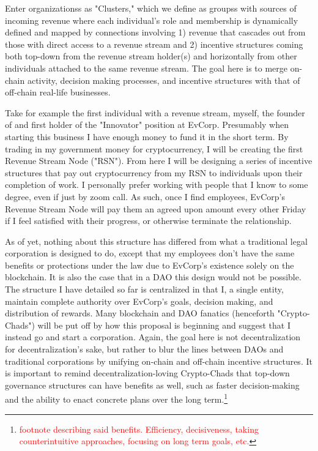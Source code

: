 \documentclass{article}[10pt]
\begin{document}
Enter organizationss as "Clusters," which we define as groupss with sources of incoming revenue where each individual's role and membership is dynamically defined and mapped by connections involving 1) revenue that cascades out from those with direct access to a revenue stream and 2) incentive structures coming both top-down from the revenue stream holder(s) and horizontally from other individuals attached to the same revenue stream. 
The goal here is to merge on-chain activity, decision making processes, and incentive structures with that of off-chain real-life businesses.\par

Take for example the first individual with a revenue stream, myself, the founder of and first holder of the "Innovator" position at EvCorp.
Presumably when starting this business I have enough money to fund it in the short term.
By trading in my government money for cryptocurrency, I will be creating the first Revenue Stream Node ("RSN"). 
From here I will be designing a series of incentive structures that pay out cryptocurrency from my RSN to individuals upon their completion of work.
I personally prefer working with people that I know to some degree, even if just by zoom call.
As such, once I find employees, EvCorp's Revenue Stream Node will pay them an agreed upon amount every other Friday if I feel satisfied with their progress, or otherwise terminate the relationship.\par

As of yet, nothing about this structure has differed from what a traditional legal corporation is designed to do, except that my employees don't have the same benefits or protections under the law due to EvCorp's existence solely on the blockchain.
It is also the case that in a DAO this design would not be possible.
The structure I have detailed so far is centralized in that I, a single entity, maintain complete authority over EvCorp's goals, decision making, and distribution of rewards.
Many blockchain and DAO fanatics (henceforth "Crypto-Chads") will be put off by how this proposal is beginning and suggest that I instead go and start a corporation.
Again, the goal here is not decentralization for decentralization's sake, but rather to blur the lines between DAOs and traditional corporations by unifying on-chain and off-chain incentive structures.
It is important to remind decentralization-loving Crypto-Chads that top-down governance structures can have benefits as well, such as faster decision-making and the ability to enact concrete plans over the long term.\footnote{
    \textcolor{red}{footnote describing said benefits. Efficiency, decisiveness, taking counterintuitive approaches, focusing on long term goals, etc.}}\par
\end{document}
